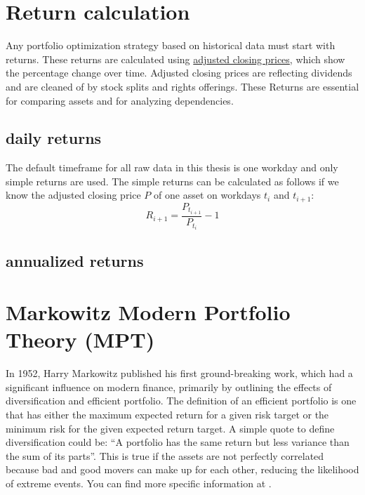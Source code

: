 \documentclass[
  oneside]{book}
\begin{document}
\hypertarget{return-calculation}{%
\section{Return calculation}\label{return-calculation}}

Any portfolio optimization strategy based on historical data must start with returns. These returns are calculated using \href{https://www.investopedia.com/terms/a/adjusted\%20closing\%20price.asp}{adjusted closing prices}, which show the percentage change over time. Adjusted closing prices are reflecting dividends and are cleaned of by stock splits and rights offerings. These Returns are essential for comparing assets and for analyzing dependencies.

\hypertarget{daily-returns}{%
\subsection{daily returns}\label{daily-returns}}

The default timeframe for all raw data in this thesis is one workday and only simple returns are used. The simple returns can be calculated as follows if we know the adjusted closing price \(P\) of one asset on workdays \(t_i\) and \(t_{i+1}\):
\[
  R_{i+1} = \frac{P_{t_{i+1}}}{P_{t_i}}-1
\]

\hypertarget{annualized-returns}{%
\subsection{annualized returns}\label{annualized-returns}}

\hypertarget{markowitz-modern-portfolio-theory-mpt}{%
\section{Markowitz Modern Portfolio Theory (MPT)}\label{markowitz-modern-portfolio-theory-mpt}}

In 1952, Harry Markowitz published his first ground-breaking work, which had a significant influence on modern finance, primarily by outlining the effects of diversification and efficient portfolio. The definition of an efficient portfolio is one that has either the maximum expected return for a given risk target or the minimum risk for the given expected return target. A simple quote to define diversification could be: ``A portfolio has the same return but less variance than the sum of its parts''. This is true if the assets are not perfectly correlated because bad and good movers can make up for each other, reducing the likelihood of extreme events. You can find more specific information at \citep{Mari2005}.
\end{document}
